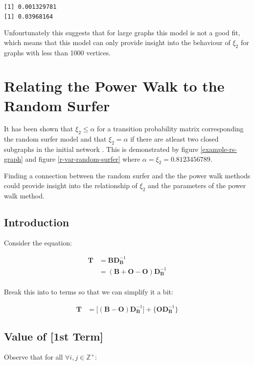 \documentclass[11pt]{article}
\begin{document}
\begin{verbatim}
[1] 0.001329781
[1] 0.03968164
\end{verbatim}


Unfourtunately this suggests that for large graphs this model is not a good fit,
which means that this model can only provide insight into the behaviour of
\(\xi_{2}\) for graphs with less than 1000 vertices.

\section{Relating the Power Walk to the Random Surfer}
\label{relate-to-random-surfer}
It has been shown that \(\xi_{2} \leq \alpha\) for a transition probability matrix corresponding the random surfer model and that \(\xi_{2} = \alpha\) if there are atleast two closed subgraphs in the initial network \cite{haveliwalaSecondEigenvalueGoogle2003}. This is demonstrated by figure \ref{example-rs-graph} and figure \ref{r-var-random-surfer} where \(\alpha = \xi_{2} = 0.8123456789\).

Finding a connection between the random surfer and the the power walk methods could provide insight into the relationship of \(\xi_{2}\) and the parameters of the power walk method.

\subsection{Introduction}
\label{sec:org07b66b7}
Consider the equation:


\begin{align*}
\mathbf{T}&= \mathbf{B}\mathbf{D}_{\mathbf{B}}^{- 1} \\
&= \left( \mathbf{B}+  \mathbf{O} - \mathbf{O} \right) \mathbf{D}_{\mathbf{B}}^{- 1} \\
\end{align*}


Break this into to terms so that we can simplify it a bit:


\begin{align*}
    \mathbf{T} &= \Bigg[ \left( \mathbf{B}- \mathbf{O} \right)\mathbf{D}_{\mathbf{B}}^{- 1} \Bigg] + \Bigg\{  \mathbf{O}\mathbf{D}_{\mathbf{B}}^{- 1} \Bigg\}
\end{align*}
\subsection{Value of [1st Term]}
\label{value-of-1st-term}
Observe that for all \(\forall i,j\in \mathbb{Z}^+\):
\end{document}
